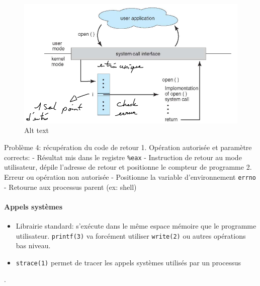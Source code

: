 \begin{figure}
\centering
\includegraphics{image-13.png}
\caption{Alt text}
\end{figure}

Problème 4: récupération du code de retour 1. Opération autorisée et
paramètre corrects: - Résultat mis dans le registre \texttt{\%eax} -
Instruction de retour au mode utilisateur, dépile l'adresse de retour et
positionne le compteur de programme 2. Erreur ou opération non autorisée
- Positionne la variable d'environnement \texttt{errno} - Retourne aux
processus parent (ex: shell)

\paragraph{Appels systèmes}\label{appels-systuxe8mes}

\begin{itemize}
\tightlist
\item
  Librairie standard: s'exécute dans le même espace mémoire que le
  programme utilisateur. \texttt{printf(3)} va forcément utiliser
  \texttt{write(2)} ou autres opérations bas niveau.
\item
  \texttt{strace(1)} permet de tracer les appels systèmes utilisés par
  un processus
\end{itemize}

.

